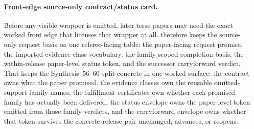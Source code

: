 \documentclass[11pt]{article}
\begin{document}
\paragraph{Front-edge source-only contract/status card.}
Before any visible wrapper is emitted, later terse papers may need the exact worked front edge that licenses that wrapper at all.
 therefore keeps the source-only request basis on one referee-facing table: the paper-facing request promise, the imported evidence-class vocabulary, the family-scoped completion basis, the within-release paper-level status token, and the successor carryforward verdict.
That keeps the Synthesis~56--60 split concrete in one worked surface: the contract owns what the paper promised, the evidence classes own the reusable omitted-support family names, the fulfillment certificates own whether each promised family has actually been delivered, the status envelope owns the paper-level token emitted from those family verdicts, and the carryforward envelope owns whether that token survives the concrete release pair unchanged, advances, or reopens.\cite{series:publicrequestcontracts,series:requestableevidenceclasses,series:requestfulfillmentcertificates,series:publicrequeststatusenvelopes,series:publicrequestcarryforward}
\end{document}
